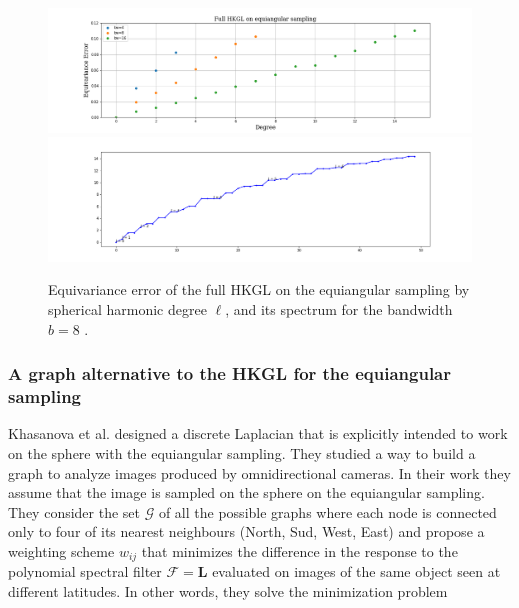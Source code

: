 \begin{figure}[h!]
	\centering
	\includegraphics[width=\textwidth]{../codes/06.Equivariance_error/FullHKGLonequiangularsampling.png}
	\includegraphics[width=\textwidth]{../codes/02.HeatKernelGraphLaplacian/equiangular/equi_full_eigenvalues_16.png}
	\caption{\label{fig:Equivariance error of the full HKGL}Equivariance error of the full HKGL on the equiangular sampling by spherical harmonic degree $\ell$, and its spectrum for the bandwidth $b=8$ .}
\end{figure}

\subsubsection{A graph alternative to the HKGL for the equiangular sampling}\label{sec:Chapter3:Frossard}

Khasanova et al. \cite{Frossard2017GraphBasedCO} designed a discrete Laplacian that is explicitly intended to work on the sphere with the equiangular sampling. They studied a way to build a graph to analyze images produced by omnidirectional cameras. In their work they assume that the image is sampled on the sphere on the equiangular sampling. They consider the set $\mathcal G$ of all the possible graphs where each node is connected only to four of its nearest neighbours (North, Sud, West, East) and propose a weighting scheme $w_{ij}$ that minimizes the difference in the response to the polynomial spectral filter $\mathcal F = \mathbf L$ evaluated on images of the same object seen at different latitudes. In other words, they solve the minimization problem

